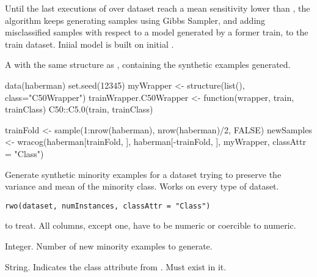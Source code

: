 %
\begin{Details}\relax
Until the last  executions of  over
 dataset reach a mean sensitivity lower than
, the algorithm keeps generating samples using Gibbs Sampler,
and adding misclassified samples with respect to a model generated by a
former train, to the train dataset. Iniial model is built on initial
.
\end{Details}
%
\begin{Value}
A  with the same structure as ,
containing the synthetic examples generated.
\end{Value}
%
\begin{Examples}
\begin{ExampleCode}
data(haberman)
set.seed(12345)
myWrapper <- structure(list(), class="C50Wrapper")
trainWrapper.C50Wrapper <- function(wrapper, train, trainClass){
  C50::C5.0(train, trainClass)
}

trainFold <- sample(1:nrow(haberman), nrow(haberman)/2, FALSE)
newSamples <- wracog(haberman[trainFold, ], haberman[-trainFold, ],
                     myWrapper, classAttr = "Class")

\end{ExampleCode}
\end{Examples}
%
\begin{Description}\relax
Generate synthetic minority examples for a dataset trying to preserve the
variance and mean of the minority class. Works on every type of dataset.
\end{Description}
%
\begin{Usage}
\begin{verbatim}
rwo(dataset, numInstances, classAttr = "Class")
\end{verbatim}
\end{Usage}
%
\begin{Arguments}
\begin{ldescription}
\item[\code{dataset}]  to treat. All columns, except
 one, have to be numeric or coercible to numeric.

\item[\code{numInstances}] Integer. Number of new minority examples to generate.

\item[\code{classAttr}] String. Indicates the class attribute from .
Must exist in it.
\end{ldescription}
\end{Arguments}
